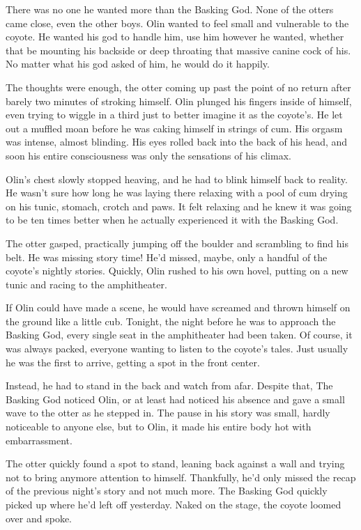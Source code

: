 There was no one he wanted more than the Basking God. None of the otters came close, even the other boys. Olin wanted to feel small and vulnerable to the coyote. He wanted his god to handle him, use him however he wanted, whether that be mounting his backside or deep throating that massive canine cock of his. No matter what his god asked of him, he would do it happily.

The thoughts were enough, the otter coming up past the point of no return after barely two minutes of stroking himself. Olin plunged his fingers inside of himself, even trying to wiggle in a third just to better imagine it as the coyote's. He let out a muffled moan before he was caking himself in strings of cum. His orgasm was intense, almost blinding. His eyes rolled back into the back of his head, and soon his entire consciousness was only the sensations of his climax.

Olin's chest slowly stopped heaving, and he had to blink himself back to reality. He wasn't sure how long he was laying there relaxing with a pool of cum drying on his tunic, stomach, crotch and paws. It felt relaxing and he knew it was going to be ten times better when he actually experienced it with the Basking God.

The otter gasped, practically jumping off the boulder and scrambling to find his belt. He was missing story time! He'd missed, maybe, only a handful of the coyote's nightly stories. Quickly, Olin rushed to his own hovel, putting on a new tunic and racing to the amphitheater.

If Olin could have made a scene, he would have screamed and thrown himself on the ground like a little cub. Tonight, the night before he was to approach the Basking God, every single seat in the amphitheater had been taken. Of course, it was always packed, everyone wanting to listen to the coyote's tales. Just usually he was the first to arrive, getting a spot in the front center.

Instead, he had to stand in the back and watch from afar. Despite that, The Basking God noticed Olin, or at least had noticed his absence and gave a small wave to the otter as he stepped in. The pause in his story was small, hardly noticeable to anyone else, but to Olin, it made his entire body hot with embarrassment.

The otter quickly found a spot to stand, leaning back against a wall and trying not to bring anymore attention to himself. Thankfully, he'd only missed the recap of the previous night's story and not much more. The Basking God quickly picked up where he'd left off yesterday. Naked on the stage, the coyote loomed over and spoke.


